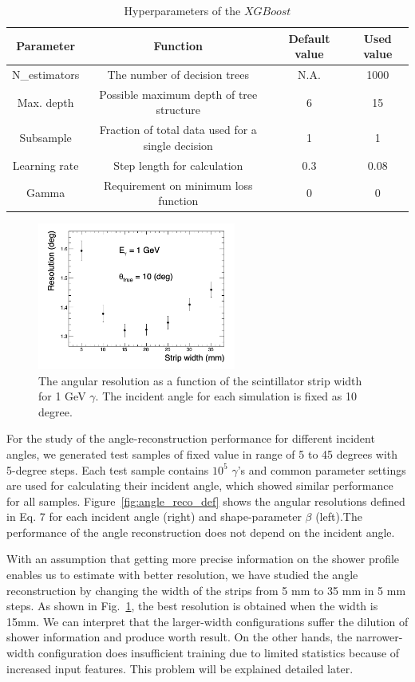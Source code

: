 \documentclass[jkps,preprint,fleqn,showpacs,showkeys]{revtex4}
\newcommand{\XGB}{XGBoost}
\begin{document}
\begin{table}[hbt!]
\centering
\caption{Hyperparameters of the $\XGB$}
\begin{tabular}{cccc}
\hline 
Parameter & Function & Default value & Used value \\ \hline 
N\_estimators & The number of decision trees & N.A. & 1000 \\  
Max. depth & Possible maximum depth of tree structure & 6 & 15 \\ 
Subsample & Fraction of total data used for a single decision & 1 & 1 \\ 
Learning rate & Step length for calculation & 0.3 & 0.08 \\ 
Gamma & Requirement on minimum loss function & 0 & 0 \\ 
\hline
\end{tabular}
\label{tab:XgbPar}
\end{table}


\begin{figure}[!hbt]
\includegraphics[width=0.58\textwidth]{figures/res_width.jpg}
\caption{ The angular resolution as a function of the scintillator strip width for 1 GeV $\gamma$. The incident angle for each simulation is fixed as 10 degree.  }
\label{fig:angle_reco_width}
\end{figure}

For the study of the angle-reconstruction performance for different incident angles, we generated test samples of fixed value in range of 5 to 45 degrees with 5-degree steps. Each test sample contains $10^5$ $\gamma$'s and common parameter settings are used for calculating their incident angle, which showed similar performance for all samples. Figure~\ref{fig:angle_reco_def} shows the angular resolutions defined in Eq. 7 for each incident angle (right) and shape-parameter $\beta$ (left).The performance of the angle reconstruction does not depend on the incident angle. 

With an assumption that getting more precise information on the shower profile enables us to estimate with better resolution, we have studied the angle reconstruction by changing the width of the strips from 5 mm to 35 mm in 5 mm steps. As shown in Fig.~\ref{fig:angle_reco_width}, the best resolution is obtained when the width is 15mm. We can interpret that the larger-width configurations suffer the dilution of shower information and produce worth result. On the other hands, the narrower-width configuration does insufficient training due to limited statistics because of increased input features. This problem will be explained detailed later. 
\end{document}
